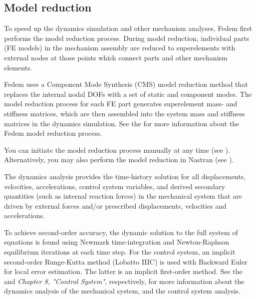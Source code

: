 \clearpage



\subsection{Model reduction}

To speed up the dynamics simulation and other mechanism analyses,
Fedem first performs the model reduction process.
During model reduction, individual parts (FE models) in the mechanism assembly
are reduced to superelements with external nodes at those points which connect
parts and other mechanism elements.

Fedem uses a Component Mode Synthesis (CMS) model reduction method that replaces
the internal nodal DOFs with a set of static and component modes.
The model reduction process for each FE part generates superelement mass- and
stiffness matrices, which are then assembled into the system mass and stiffness
matrices in the dynamics simulation.
See the 
for more information about the Fedem model reduction process.

You can initiate the model reduction process manually at any time
(see ).
Alternatively, you may also perform the model reduction in Nastran
(see ).



The dynamics analysis provides the time-history solution for all displacements,
velocities, accelerations, control system variables, and derived secondary
quantities (such as internal reaction forces) in the mechanical system that are
driven by external forces and/or prescribed displacements, velocities and
accelerations.

To achieve second-order accuracy, the dynamic solution to the full system of
equations is found using Newmark time-integration and Newton-Raphson equilibrium
iterations at each time step.
For the control system, an implicit second-order Runge-Kutta method
(Lobatto IIIC) is used with Backward Euler for local error estimation.
The latter is an implicit first-order method.
See the 
and {\sl Chapter 8, "Control System"}, respectively, for more information about
the dynamics analysis of the mechanical system, and the control system analysis.

